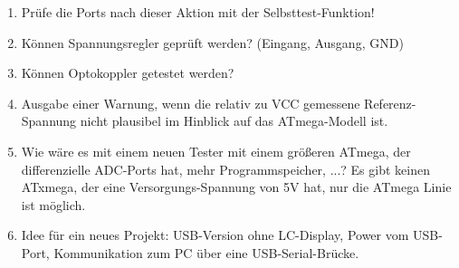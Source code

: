 \begin{enumerate}
\item Prüfe die Ports nach dieser Aktion mit der Selbsttest-Funktion!
\item Können Spannungsregler geprüft werden? (Eingang, Ausgang, GND)
\item Können Optokoppler getestet werden?
\item Ausgabe einer Warnung, wenn die relativ zu VCC gemessene Referenz-Spannung nicht plausibel im Hinblick auf das ATmega-Modell ist.
\item Wie wäre es mit einem neuen Tester mit einem größeren ATmega, der differenzielle ADC-Ports hat,
mehr Programmspeicher, ...?
Es gibt keinen ATxmega, der eine Versorgungs-Spannung von 5V hat, nur die ATmega Linie ist möglich.
\item Idee für ein neues Projekt: USB-Version ohne LC-Display, Power vom USB-Port, Kommunikation zum PC über eine USB-Serial-Brücke.
\end{enumerate}
